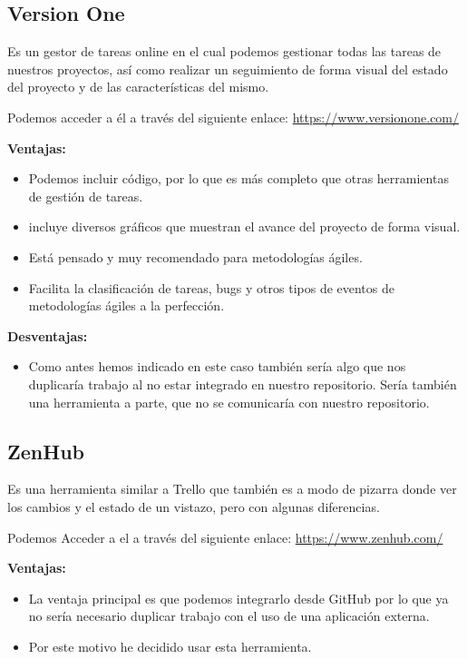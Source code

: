 \subsection{Version One}
Es un gestor de tareas online en el cual podemos gestionar todas las tareas de nuestros proyectos, así como realizar un seguimiento de forma visual del estado del proyecto y de las características del mismo.

Podemos acceder a él a través del siguiente enlace: 
\url{https://www.versionone.com/}


\textbf{Ventajas:}

\begin{itemize}
\item Podemos incluir código, por lo que es más completo que otras herramientas de gestión de tareas.
\item incluye diversos gráficos que muestran el avance del proyecto de forma visual.
\item Está pensado y muy recomendado para metodologías ágiles.
\item Facilita la clasificación de tareas, bugs y otros tipos de eventos de metodologías ágiles a la perfección.
\end{itemize}

\textbf{Desventajas:}

\begin{itemize}
\item Como antes hemos indicado en este caso también sería algo que nos duplicaría trabajo al no estar integrado en nuestro repositorio. Sería también una herramienta a parte, que no se comunicaría con nuestro repositorio.
\end{itemize}


\subsection{ZenHub}
Es una herramienta similar a Trello que también es a modo de pizarra donde ver los cambios y el estado de un vistazo, pero con algunas diferencias.

Podemos Acceder a el a través del siguiente enlace: 
\url{https://www.zenhub.com/}



\textbf{Ventajas:}

\begin{itemize}
\item La ventaja principal es que podemos integrarlo desde GitHub por lo que ya no sería necesario duplicar trabajo con el uso de una aplicación externa.

\item Por este motivo he decidido usar esta herramienta.

\end{itemize}

